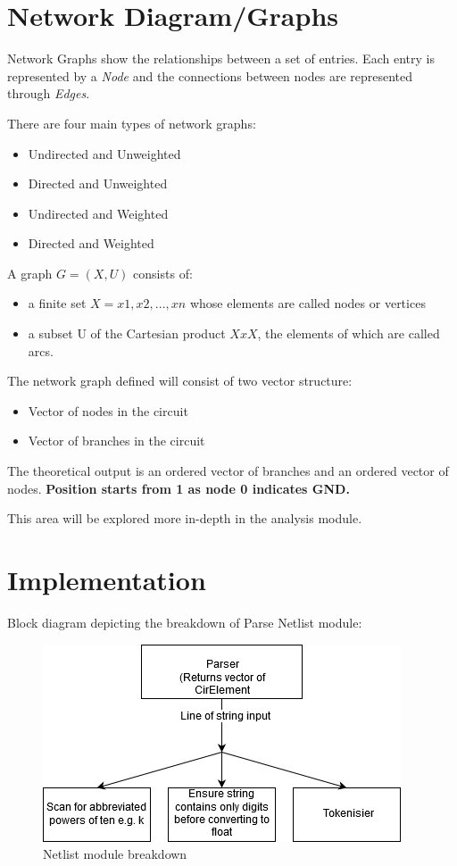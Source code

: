 \documentclass[a4paper, titlepage]{article}
\begin{document}
    \section{Network Diagram/Graphs}
    Network Graphs show the relationships between a set of entries. Each entry is represented by a \textit{Node} and the connections between nodes are represented through \textit{Edges}.
    \par
    There are four main types of network graphs:
    \begin{itemize}
        \item Undirected and Unweighted
        \item Directed and Unweighted
        \item Undirected and Weighted
        \item Directed and Weighted
    \end{itemize}
    \par
    A graph $G=(X,U)$ consists of: \cite{parse}
    \begin{itemize}
        \item a finite set $X = {x1,x2,...,xn}$ whose elements are called nodes or vertices
        \item a subset U of the Cartesian product $X x X$, the elements of which are called arcs.
    \end{itemize}
    The network graph defined will consist of two vector structure:
    \begin{itemize}
        \item Vector of nodes in the circuit
        \item Vector of branches in the circuit
    \end{itemize}
    The theoretical output is an ordered vector of branches and an ordered vector of nodes. 
    \textbf{Position starts from 1 as node 0 indicates GND.}
    \par
    This area will be explored more in-depth in the analysis module.
    \pagebreak

    \section{Implementation}
    Block diagram depicting the breakdown of Parse Netlist module:
    \begin{figure}[h]
    \centering
    \includegraphics[scale=0.75]{Netlist breakdown}
    \caption{Netlist module breakdown}
    \label{fig:Netlist breakdown}
    \end{figure}
    
\end{document}
